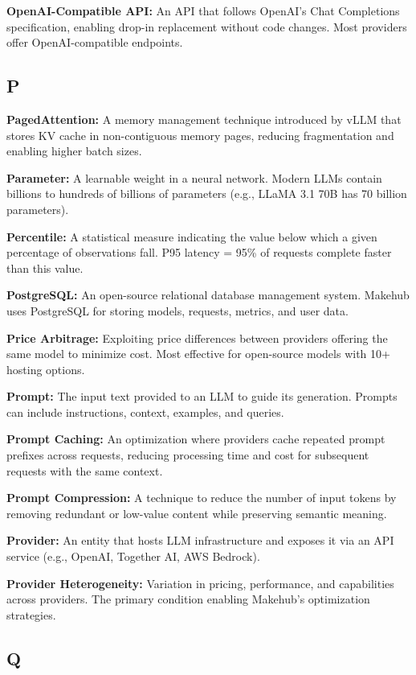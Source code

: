 \documentclass[english]{article}
\begin{document}
\textbf{OpenAI-Compatible API:} An API that follows OpenAI's Chat Completions specification, enabling drop-in replacement without code changes. Most providers offer OpenAI-compatible endpoints.

\subsection*{P}

\textbf{PagedAttention:} A memory management technique introduced by vLLM that stores KV cache in non-contiguous memory pages, reducing fragmentation and enabling higher batch sizes.

\textbf{Parameter:} A learnable weight in a neural network. Modern LLMs contain billions to hundreds of billions of parameters (e.g., LLaMA 3.1 70B has 70 billion parameters).

\textbf{Percentile:} A statistical measure indicating the value below which a given percentage of observations fall. P95 latency = 95\% of requests complete faster than this value.

\textbf{PostgreSQL:} An open-source relational database management system. Makehub uses PostgreSQL for storing models, requests, metrics, and user data.

\textbf{Price Arbitrage:} Exploiting price differences between providers offering the same model to minimize cost. Most effective for open-source models with 10+ hosting options.

\textbf{Prompt:} The input text provided to an LLM to guide its generation. Prompts can include instructions, context, examples, and queries.

\textbf{Prompt Caching:} An optimization where providers cache repeated prompt prefixes across requests, reducing processing time and cost for subsequent requests with the same context.

\textbf{Prompt Compression:} A technique to reduce the number of input tokens by removing redundant or low-value content while preserving semantic meaning.

\textbf{Provider:} An entity that hosts LLM infrastructure and exposes it via an API service (e.g., OpenAI, Together AI, AWS Bedrock).

\textbf{Provider Heterogeneity:} Variation in pricing, performance, and capabilities across providers. The primary condition enabling Makehub's optimization strategies.

\subsection*{Q}
\end{document}
